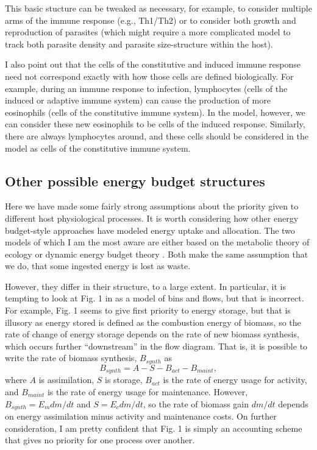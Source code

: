 \documentclass[11pt,reqno,final,pdftex]{amsart}\usepackage[]{graphicx}\usepackage[]{color}
\theoremstyle{plain}
\numberwithin{equation}{part}
\begin{document}
This basic stucture can be tweaked as necessary, for example, to consider multiple arms of the immune response (e.g., Th1/Th2) or to consider both growth and reproduction of parasites (which might require a more complicated model to track both parasite density and parasite size-structure within the host).

I also point out that the cells of the constitutive and induced immune response need not correspond exactly with how those cells are defined biologically.
For example, during an immune response to infection, lymphocytes (cells of the induced or adaptive immune system) can cause the production of more eosinophils (cells of the constitutive immune system).
In the model, however, we can consider these new eosinophils to be cells of the induced response.
Similarly, there are always lymphocytes around, and these cells should be considered in the model as cells of the constitutive immune system.

\subsection*{Other possible energy budget structures}
Here we have made some fairly strong assumptions about the priority given to different host physiological processes.
It is worth considering how other energy budget-style approaches have modeled energy uptake and allocation.
The two models of which I am the most aware are either based on the metabolic theory of ecology \citep[MTE,][]{Hou2008} or dynamic energy budget theory \citep{Kooijman2009}.
Both make the same assumption that we do, that some ingested energy is lost as waste.

However, they differ in their structure, to a large extent.
In particular, it is tempting to look at Fig. 1 in \citet{Hou2008} as a model of bins and flows, but that is incorrect.
For example, Fig. 1 seems to give first priority to energy storage, but that is illusory as energy stored is defined as the combustion energy of biomass, so the rate of change of energy storage depends on the rate of new biomass synthesis, which occurs further ``downstream'' in the flow diagram.
That is, it is possible to write the rate of biomass synthesis, $B_{synth}$ as
\begin{equation}
B_{synth} = A - S - B_{act} - B_{maint},
\end{equation}
where $A$ is assimilation, $S$ is storage, $B_{act}$ is the rate of energy usage for activity, and $B_{maint}$ is the rate of energy usage for maintenance.
However, $B_{synth} = E_m dm/dt$ and $S = E_c dm/dt$, so the rate of biomass gain $dm/dt$ depends on energy assimilation minus activity and maintenance costs.
On further consideration, I am pretty confident that Fig. 1 is simply an accounting scheme that gives no priority for one process over another.
\end{document}
